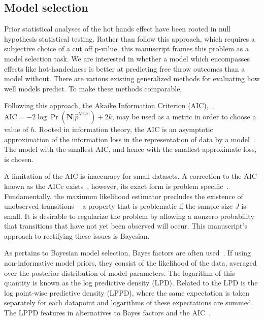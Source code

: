 \documentclass{IOS-Book-Article}
\newcommand{\bN}{\mathbf{N}}
\begin{document}
\subsection{Model selection}

Prior statistical analyses of the hot hands effect have been rooted in null hypothesis statistical testing. Rather than follow this
approach, which requires a subjective choice of a cut off p-value, this manuscript frames this problem as a model selection task.
We are interested in whether a model which encompasses effects like hot-handedness is better at predicting free throw outcomes
than a model without. There are various existing generalized methods for evaluating how well models predict. To make these
methods comparable, 

Following this approach, the Akaike Information Criterion (AIC),~\cite{akaike1974new,tong1975determination,katz1981some}, $\textrm{AIC}=-2\log\Pr(\bN\vert \hat{p}^{\textrm{MLE}})+2k$,
 may be used as a metric in order to choose a value of $h$.  Rooted in information theory, the AIC is an asymptotic approximation of the information loss in the representation of data by a model~\cite{burnham2003model}. The model with the smallest AIC, and hence with the smallest approximate loss, is chosen.

A limitation of the AIC is inaccuracy for small datasets. A correction to the AIC known as the AICc exists~\cite{hurvich1989regression}, however, its exact form is problem specific~\cite{burnham2003model}. Fundamentally, the maximum likelihood estimator precludes the existence of unobserved transitions -- a property that is problematic if  the sample size $J$ is small.
It is desirable to regularize the problem by allowing a nonzero probability that
transitions that have not yet been observed will occur. This manuscript's approach to rectifying these issues is Bayesian.





As pertains to Bayesian model selection,  Bayes factors are often used~\cite{lavine1999bayes,posada2004model}. If using non-informative model priors, they consist of the likelihood of the data, averaged over the posterior distribution of model parameters. The logarithm of this quantity is known as the log predictive density (LPD). Related to the LPD is the log point-wise predictive density (LPPD), where the same expectation is taken separately for each datapoint and logarithms of these expectations are summed. The LPPD features in alternatives to Bayes factors and the AIC~\cite{gelman2014understanding}.
\end{document}
